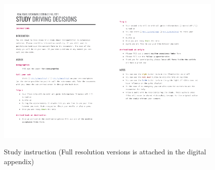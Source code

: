 \begin{figure}
     \includegraphics[width=0.5\textwidth]{fig/Instru1.pdf}\hfill\includegraphics[width=0.5\textwidth]{fig/Instru2.pdf}
    \caption[Study Instruction]{Study instruction (Full resolution versions is attached in the digital appendix)}
    \label{fig:instruction}
\end{figure}

